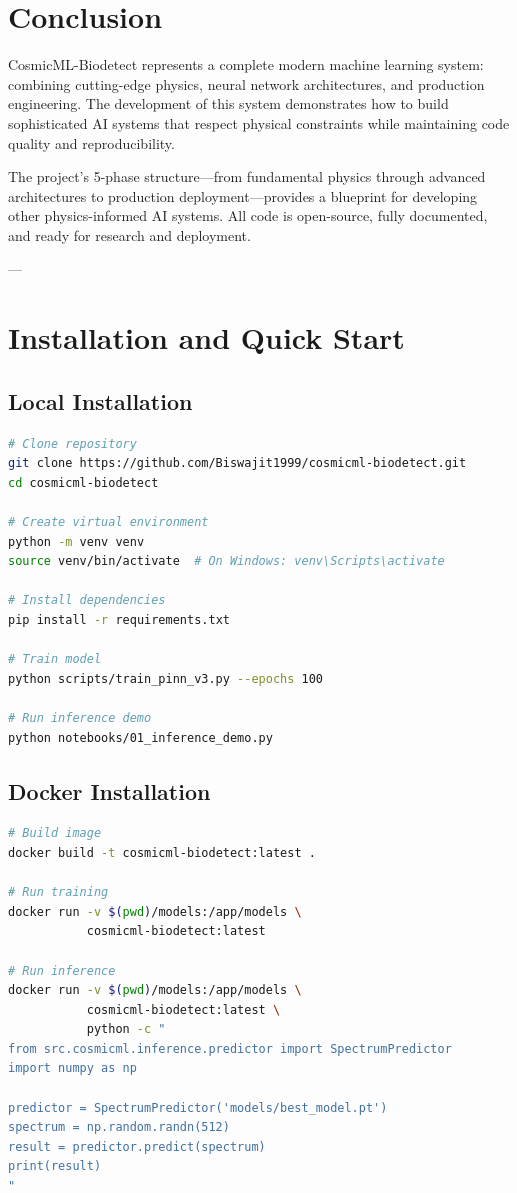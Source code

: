 \documentclass[12pt,a4paper,oneside]{report}
\begin{document}
\chapter*{Conclusion}

CosmicML-Biodetect represents a complete modern machine learning system: combining cutting-edge physics, neural network architectures, and production engineering. The development of this system demonstrates how to build sophisticated AI systems that respect physical constraints while maintaining code quality and reproducibility.

The project's 5-phase structure—from fundamental physics through advanced architectures to production deployment—provides a blueprint for developing other physics-informed AI systems. All code is open-source, fully documented, and ready for research and deployment.

---

\appendix

\chapter{Installation and Quick Start}

\section{Local Installation}

\begin{lstlisting}[language=bash]
# Clone repository
git clone https://github.com/Biswajit1999/cosmicml-biodetect.git
cd cosmicml-biodetect

# Create virtual environment
python -m venv venv
source venv/bin/activate  # On Windows: venv\Scripts\activate

# Install dependencies
pip install -r requirements.txt

# Train model
python scripts/train_pinn_v3.py --epochs 100

# Run inference demo
python notebooks/01_inference_demo.py
\end{lstlisting}

\section{Docker Installation}

\begin{lstlisting}[language=bash]
# Build image
docker build -t cosmicml-biodetect:latest .

# Run training
docker run -v $(pwd)/models:/app/models \
           cosmicml-biodetect:latest

# Run inference
docker run -v $(pwd)/models:/app/models \
           cosmicml-biodetect:latest \
           python -c "
from src.cosmicml.inference.predictor import SpectrumPredictor
import numpy as np

predictor = SpectrumPredictor('models/best_model.pt')
spectrum = np.random.randn(512)
result = predictor.predict(spectrum)
print(result)
"
\end{lstlisting}
\end{document}
